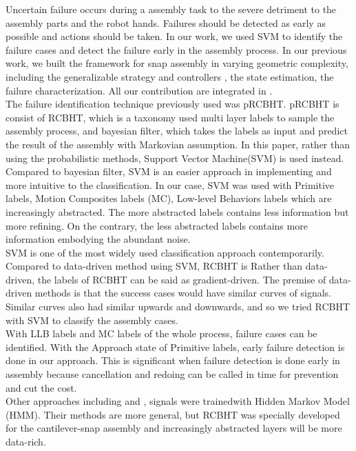 Uncertain failure occurs during a assembly task to the severe detriment to the assembly parts and the robot hands. Failures should be detected as early as possible and actions should be taken. In our work, we used SVM to identify the failure cases and detect the failure early in the assembly process.
\indent In our previous work, we built the framework for snap assembly in varying geometric complexity, including the generalizable strategy and controllers\cite{2012JAR-Rojas-AutHetBotAsmbly} \cite{2012ICMA-Rojas-PivotApproach}, the state estimation\cite{2012IROS-Rojas-RCBHT}, the failure characterization\cite{2012Humanoids-Rojas-pRCBHT}. All our contribution are integrated in \cite{2013IJMA-Rojas-TwrdsSnapSensing}. \\
\indent The failure identification technique previously used was pRCBHT\cite{2013IJMA-Rojas-TwrdsSnapSensing}. pRCBHT is consist of RCBHT, which is a taxonomy used multi layer labels to sample the assembly process, and bayesian filter, which takes the labels as input and predict the result of the assembly with Markovian assumption. In this paper, rather than using the probabilistic methods, Support Vector Machine(SVM) is used instead. Compared to bayesian filter, SVM is an easier approach in implementing and more intuitive to the classification. In our case, SVM was used with Primitive labels, Motion Composites labels (MC), Low-level Behaviors labels which are increasingly abstracted. The more abstracted labels contains less information but more refining. On the contrary, the less abstracted labels contains more information embodying the abundant noise. \\
\indent SVM is one of the most widely used classification approach contemporarily. Compared to data-driven method using SVM\cite{masonfailure}, RCBHT is Rather than data-driven, the labels of RCBHT can be said as gradient-driven. The premise of data-driven methods is that the success cases would have similar curves of signals. Similar curves also had similar upwards and downwards, and so we tried RCBHT with SVM to classify the assembly cases. \\
\indent With LLB labels and MC labels of the whole process, failure cases can be identified. With the Approach state of Primitive labels, early failure detection is done in our approach. This is significant when failure detection is done early in assembly because cancellation and redoing can be called in time for prevention and cut the cost.\\
\indent Other approaches including \cite{rodriguez2011abort} and \cite{di2013bayesian}, signals were trainedwith Hidden Markov Model (HMM). Their methods are more general, but RCBHT was specially developed for the cantilever-snap assembly and increasingly abstracted layers will be more data-rich. \\
